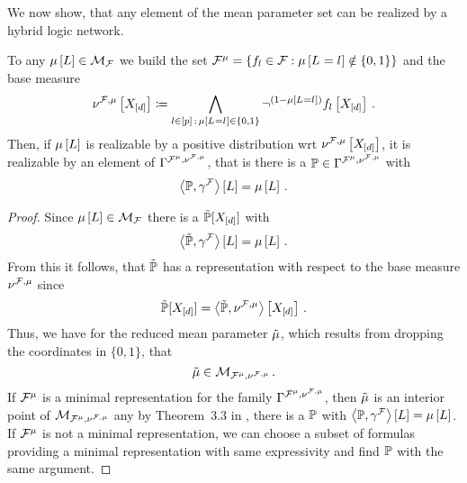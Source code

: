 We now show, that any element of the mean parameter set can be realized by a hybrid logic network.

\begin{theorem}
	To any $\mu\left[L\right]\in\mathcal{M}_{\mathcal{F}}$ we build the set $\mathcal{F}^{\mu}=\{f_{l}\in\mathcal{F} : \mu\left[L_{}=l_{}\right]\notin\{0,1\}\}$ and the base measure
			\[ \nu^{\mathcal{F},\mu}\left[X_{[d]}\right] \coloneqq \bigwedge_{l\in[p] \, : \, \mu\left[L_{}=l_{}\right]\in\{0,1\}}
		\lnot^{(1-\mu\left[L_{}=l_{}\right])} f_{l}\left[X_{[d]}\right] \, . \]
	Then, if $\mu\left[L\right]$ is realizable by a positive distribution wrt $\nu^{\mathcal{F},\mu}\left[X_{[d]}\right]$, it is realizable by an element of $\Gamma^{\mathcal{F}^{\mu},\nu^{\mathcal{F},\mu}}$, that is there is a $\mathbb{P}\in\Gamma^{\mathcal{F}^{\mu},\nu^{\mathcal{F},\mu}}$ with
		\[ \left\langle \mathbb{P},\gamma^{\mathcal{F}}\right\rangle \left[ L \right] = \mu\left[L\right] \, .  \] 
\end{theorem}
\begin{proof}
	Since $\mu\left[L\right]\in\mathcal{M}_{\mathcal{F}}$ there is a $\tilde{\mathbb{P}}[X_{[d]}]$ with 
		\[ \left\langle \tilde{\mathbb{P}},\gamma^{\mathcal{F}}\right\rangle \left[ L \right] = \mu\left[L\right] \, . \]
	From this it follows, that $\tilde{\mathbb{P}}$ has a representation with respect to the base measure $\nu^{\mathcal{F},\mu}$ since
		\[ \tilde{\mathbb{P}}[X_{[d]}] = \left\langle \tilde{\mathbb{P}},\nu^{\mathcal{F},\mu}\right\rangle \left[ X_{[d]} \right]  \, . \]
	Thus, we have for the reduced mean parameter $\tilde{\mu}$, which results from dropping the coordinates in $\{0,1\}$, that
		\[ \tilde{\mu} \in \mathcal{M}_{\mathcal{F}^{\mu},\nu^{\mathcal{F},\mu}} \, . \]
	If $\mathcal{F}^{\mu}$ is a minimal representation for the family $\Gamma^{\mathcal{F}^{\mu},\nu^{\mathcal{F},\mu}}$,
	then $\tilde{\mu}$ is an interior point of $\mathcal{M}_{\mathcal{F}^{\mu},\nu^{\mathcal{F},\mu}}$ any by Theorem~3.3 in \cite{wainwright_graphical_2008}, there is a $\mathbb{P}$ with $\left\langle \mathbb{P},\gamma^{\mathcal{F}}\right\rangle \left[ L \right] = \mu\left[L\right]$.
	If $\mathcal{F}^{\mu}$ is not a minimal representation, we can choose a subset of formulas providing a minimal representation with same expressivity and find $\mathbb{P}$ with the same argument.
\end{proof}


